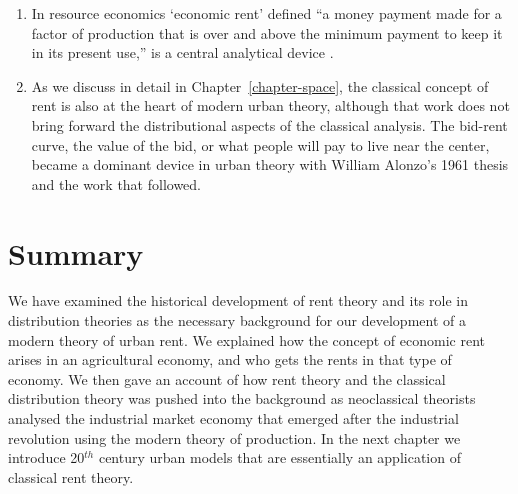 \begin{enumerate}
\item In resource economics `economic rent' defined ``a money payment made for a factor of production that is over and above the minimum payment to keep it in its present use,'' is a central analytical device \cite{Gray1914RentUT}.   
    
\item As we discuss in detail in Chapter~\ref{chapter-space}, the classical concept of rent is also at the heart of modern urban theory, although that work does not bring forward the distributional aspects of the classical analysis. The \gls{bid-rent curve}, the value of the bid, or what people will pay to live near the center, became a dominant device in urban theory with William Alonzo's 1961 thesis \cite{alonzoTheoryUrbanLand1960} and the work that followed. %
\end{enumerate}

 
\section{Summary}



We have examined the historical development  of rent theory and its role in distribution theories as the necessary background for our development of a modern theory of urban rent. We explained how the concept of economic rent arises in an agricultural economy, and who gets the rents in that type of economy. We then gave an account of how rent theory and the classical distribution theory was pushed into the background as neoclassical theorists analysed the industrial market economy that emerged after the industrial revolution using the  modern theory of production. In the next chapter we introduce 20$^{th}$ century urban models that are essentially an application of classical rent theory.


